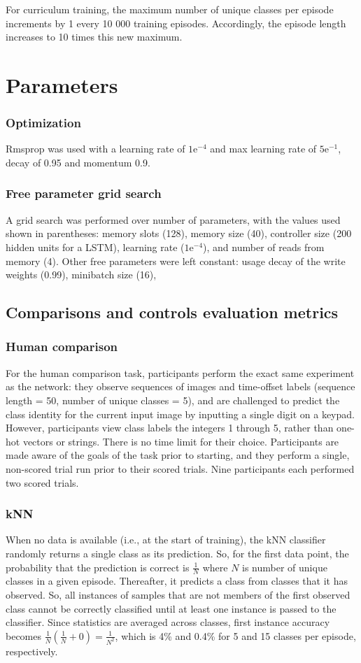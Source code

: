 \documentclass{article}
\begin{document}
For curriculum training, the maximum number of unique classes per episode increments by 1 every 10 000 training episodes. Accordingly, the episode length increases to 10 times this new maximum.

\section{Parameters}
\subsubsection{Optimization}
Rmsprop was used with a learning rate of $1\text{e}^{-4}$ and max learning rate of $5\text{e}^{-1}$, decay of 0.95 and momentum 0.9. 

\subsubsection{Free parameter grid search}
A grid search was performed over number of parameters, with the values used shown in parentheses: memory slots (128), memory size (40), controller size (200 hidden units for a LSTM), learning rate ($1\text{e}^{-4}$), and number of reads from memory (4). Other free parameters were left constant: usage decay of the write weights (0.99), minibatch size (16),  


\subsection{Comparisons and controls evaluation metrics}
\subsubsection{Human comparison}
For the human comparison task, participants perform the exact same experiment as the network: they observe sequences of images and time-offset labels (sequence length = 50, number of unique classes = 5), and are challenged to predict the class identity for the current input image by inputting a single digit on a keypad. However, participants view class labels the integers 1 through 5, rather than one-hot vectors or strings. There is no time limit for their choice. Participants are made aware of the goals of the task prior to starting, and they perform a single, non-scored trial run prior to their scored trials. Nine participants each performed two scored trials.

\subsubsection{kNN}
When no data is available (i.e., at the start of training), the kNN classifier randomly returns a single class as its prediction. So, for the first data point, the probability that the prediction is correct is $\frac{1}{N}$ where $N$ is number of unique classes in a given episode. Thereafter, it predicts a class from classes that it has observed. So, all instances of samples that are not members of the first observed class cannot be correctly classified until at least one instance is passed to the classifier. Since statistics are averaged across classes, first instance accuracy becomes $\frac{1}{N}(\frac{1}{N} + 0) = \frac{1}{N^2}$, which is 4\% and 0.4\% for 5 and 15 classes per episode, respectively. 
\end{document}
